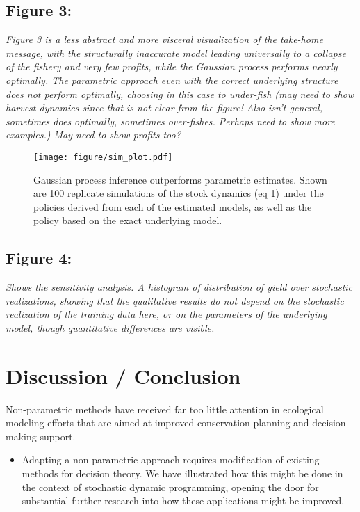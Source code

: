 \documentclass[author-year, review]{elsarticle} %
\makeatletter
\def\maxwidth{\ifdim\Gin@nat@width>\linewidth\linewidth
\else\Gin@nat@width\fi}
\let\Oldincludegraphics\includegraphics
\renewcommand{\includegraphics}[1]{\Oldincludegraphics[width=\maxwidth]{#1}}
\makeatother
\begin{document}
\subsection{Figure 3:}

\emph{Figure 3 is a less abstract and more visceral visualization of the
take-home message, with the structurally inaccurate model leading
universally to a collapse of the fishery and very few profits, while the
Gaussian process performs nearly optimally. The parametric approach even
with the correct underlying structure does not perform optimally,
choosing in this case to under-fish (may need to show harvest dynamics
since that is not clear from the figure! Also isn't general, sometimes
does optimally, sometimes over-fishes. Perhaps need to show more
examples.) May need to show profits too?}

\begin{figure}[htbp]
\centering
\texttt{[image: figure/sim\_plot.pdf]}
\caption{Gaussian process inference outperforms parametric estimates.
Shown are 100 replicate simulations of the stock dynamics (eq 1) under
the policies derived from each of the estimated models, as well as the
policy based on the exact underlying model.}
\end{figure}

\subsection{Figure 4:}

\emph{Shows the sensitivity analysis. A histogram of distribution of
yield over stochastic realizations, showing that the qualitative results
do not depend on the stochastic realization of the training data here,
or on the parameters of the underlying model, though quantitative
differences are visible.}

\section{Discussion / Conclusion}

Non-parametric methods have received far too little attention in
ecological modeling efforts that are aimed at improved conservation
planning and decision making support.

\begin{itemize}
\itemsep1pt\parskip0pt
\item
  Adapting a non-parametric approach requires modification of existing
  methods for decision theory. We have illustrated how this might be
  done in the context of stochastic dynamic programming, opening the
  door for substantial further research into how these applications
  might be improved.
\end{itemize}
\end{document}
